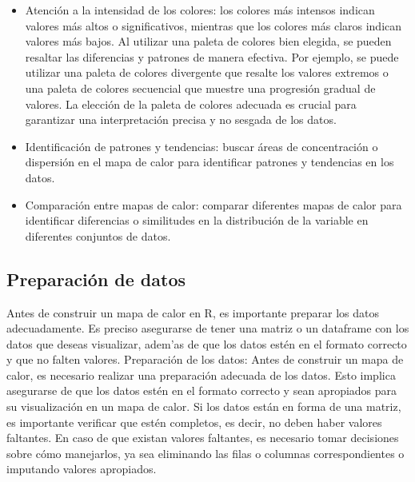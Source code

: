 \documentclass{article}
\begin{document}
\begin{itemize}
\item Atención a la intensidad de los colores: los colores más intensos indican valores más altos o significativos, mientras que los colores más claros indican valores más bajos. Al utilizar una paleta de colores bien elegida, se pueden resaltar las diferencias y patrones de manera efectiva. Por ejemplo, se puede utilizar una paleta de colores divergente que resalte los valores extremos o una paleta de colores secuencial que muestre una progresión gradual de valores. La elección de la paleta de colores adecuada es crucial para garantizar una interpretación precisa y no sesgada de los datos.
\item Identificación de patrones y tendencias: buscar áreas de concentración o dispersión en el mapa de calor para identificar patrones y tendencias en los datos.
\item Comparación entre mapas de calor: comparar diferentes mapas de calor para identificar diferencias o similitudes en la distribución de la variable en diferentes conjuntos de datos.


\end{itemize}



\subsection{Preparación de datos}
Antes de construir un mapa de calor en R, es importante preparar los datos adecuadamente.  Es preciso asegurarse de tener una matriz o un dataframe con los datos que deseas visualizar, adem'as de que los datos estén en el formato correcto y que no falten valores.  Preparación de los datos: Antes de construir un mapa de calor, es necesario realizar una preparación adecuada de los datos. Esto implica asegurarse de que los datos estén en el formato correcto y sean apropiados para su visualización en un mapa de calor. Si los datos están en forma de una matriz, es importante verificar que estén completos, es decir, no deben haber valores faltantes. En caso de que existan valores faltantes, es necesario tomar decisiones sobre cómo manejarlos, ya sea eliminando las filas o columnas correspondientes o imputando valores apropiados.
\end{document}
